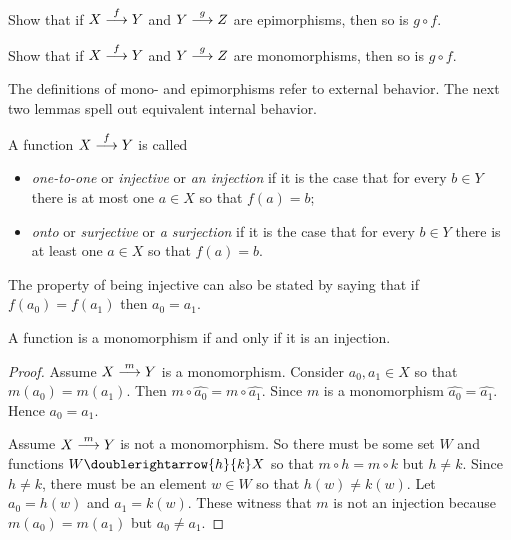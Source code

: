 \begin{exercises}
	\begin{firstexercise}
		\item Show that if $\sfromto fXY$ and $\sfromto gYZ$ are epimorphisms, then so is $g\circ f$. 
		\item Show that if $\sfromto fXY$ and $\sfromto gYZ$ are monomorphisms, then so is $g\circ f$. 
	\end{firstexercise}
\end{exercises}

The definitions of mono- and epimorphisms refer to external behavior. The next two lemmas spell out equivalent internal behavior.

\begin{defn}
	A function $\sfromto fXY$ is called
	\begin{itemize}
		\item \emph{one-to-one} or \emph{injective} or \emph{an injection} if it is the case that for every $b\in Y$ there is at most one $a\in X$ so that $f(a)=b$;
		\item \emph{onto} or \emph{surjective} or \emph{a surjection} if it is the case that for every $b\in Y$ there is at least one $a\in X$ so that $f(a)=b$.
	\end{itemize}
\end{defn}

The property of being injective can also be stated by saying that if $f(a_0)=f(a_1)$ then $a_0=a_1$.

\begin{lemma}
	A function is a monomorphism if and only if it is an injection.
	
	\begin{proof}
		Assume $\sfromto mXY$ is a monomorphism. Consider $a_0,a_1\in X$ so that $m(a_0)=m(a_1)$.
		Then $m\circ \hat{a_0} = m\circ \hat{a_1}$. Since $m$ is a monomorphism $\hat{a_0} = \hat{a_1}$. Hence $a_0=a_1$.
		
		Assume $\sfromto mXY$ is not a monomorphism. 
		So there must be some set $W$ and functions $W\doublerightarrow{h}{k}X$ so that $m\circ h=m\circ k$ but $h\neq k$.
		Since $h\neq k$, there must be an element $w\in W$ so that $h(w)\neq k(w)$. 
		Let $a_0=h(w)$ and $a_1=k(w)$. 
		These witness that $m$ is not an injection because $m(a_0)=m(a_1)$ but $a_0\neq a_1$.
	\end{proof}
\end{lemma}

